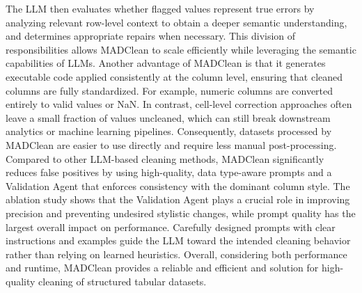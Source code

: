 The LLM then evaluates whether flagged values represent true errors by analyzing relevant row-level context to obtain a deeper semantic understanding, and determines appropriate repairs when necessary.
This division of responsibilities allows MADClean to scale efficiently while leveraging the semantic capabilities of LLMs.
\newline\newline
Another advantage of MADClean is that it generates executable code applied consistently at the column level, ensuring that cleaned columns are fully standardized. 
For example, numeric columns are converted entirely to valid values or NaN. 
In contrast, cell-level correction approaches often leave a small fraction of values uncleaned, which can still break downstream analytics or machine learning pipelines. 
Consequently, datasets processed by MADClean are easier to use directly and require less manual post-processing.
\newline\newline
Compared to other LLM-based cleaning methods, MADClean significantly reduces false positives by using high-quality, data type-aware prompts and a Validation Agent that enforces consistency with the dominant column style. 
The ablation study shows that the Validation Agent plays a crucial role in improving precision and preventing undesired stylistic changes, while prompt quality has the largest overall impact on performance. 
Carefully designed prompts with clear instructions and examples guide the LLM toward the intended cleaning behavior rather than relying on learned heuristics.
\newline\newline
Overall, considering both performance and runtime, MADClean provides a reliable and efficient and solution for high-quality cleaning of structured tabular datasets.

